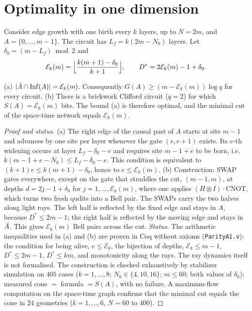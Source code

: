 \section{Optimality in one dimension}\label{sec:A1}

Consider edge growth with one birth every $k$ layers, up to $N=2m$, and $A=\{0,\dots,m-1\}$. The circuit has $L_f=k(2m-N_0)$ layers. Let $\delta_0=(m-L_f)\bmod 2$ and
\begin{equation}\label{eq:A1}
\mathcal{E}_k(m)=\Bigl\lfloor\frac{k(m+1)-\delta_0}{k+1}\Bigr\rfloor,\qquad D^\ast=2\mathcal{E}_k(m)-1+\delta_0 .
\end{equation}

\begin{proposition}[A1]\label{prop:A1}
(a) $|\bar A\cap\mathrm{Inf}(A)|=\mathcal{E}_k(m)$. Consequently $G(A)\ge(m-\mathcal{E}_k(m))\log q$ for every circuit.
(b) There is a brickwork Clifford circuit ($q=2$) for which $S(A)=\mathcal{E}_k(m)$ bits. The bound (a) is therefore optimal, and the minimal cut of the space-time network equals $\mathcal{E}_k(m)$.
\end{proposition}

\begin{proof}[Proof and status]
(a) The right edge of the causal past of $A$ starts at site $m-1$ and advances by one site per layer whenever the gate $(r,r+1)$ exists. Its $e$-th widening occurs at layer $L_f-\delta_0-e$ and requires site $m-1+e$ to be born, i.e. $k(m-1+e-N_0)\le L_f-\delta_0-e$. This condition is equivalent to $(k+1)e\le k(m+1)-\delta_0$, hence to $e\le\mathcal{E}_k(m)$.
(b) Construction: SWAP gates everywhere, except on the gate that straddles the cut, $(m-1,m)$, at depths $d=2j-1+\delta_0$ for $j=1,\dots,\mathcal{E}_k(m)$, where one applies $(H\otimes I)\cdot\mathrm{CNOT}$, which turns two fresh qudits into a Bell pair. The SWAPs carry the two halves along light rays. The left half is reflected by the fixed edge and stays in $A$, because $D^\ast\le 2m-1$; the right half is reflected by the moving edge and stays in $\bar A$. This gives $\mathcal{E}_k(m)$ Bell pairs across the cut.
\emph{Status.} The arithmetic inequalities used in (a) and (b) are proven in Coq without axioms (\texttt{ParityA1.v}): the condition for being alive, $e\le\mathcal{E}_k$, the bijection of depths, $\mathcal{E}_k\le m-1$, $D^\ast\le 2m-1$, $D^\ast\le km$, and monotonicity along the rays. The ray dynamics itself is not formalised. The construction is checked exhaustively by stabilizer simulation on $405$ cases ($k=1,\dots,8$; $N_0\in\{4,10,16\}$; $m\le60$; both values of $\delta_0$): measured cone $=$ formula $=S(A)$, with no failure. A maximum-flow computation on the space-time graph confirms that the minimal cut equals the cone in $24$ geometries ($k=1,\dots,6$, $N=60$ to $400$).
\end{proof}

